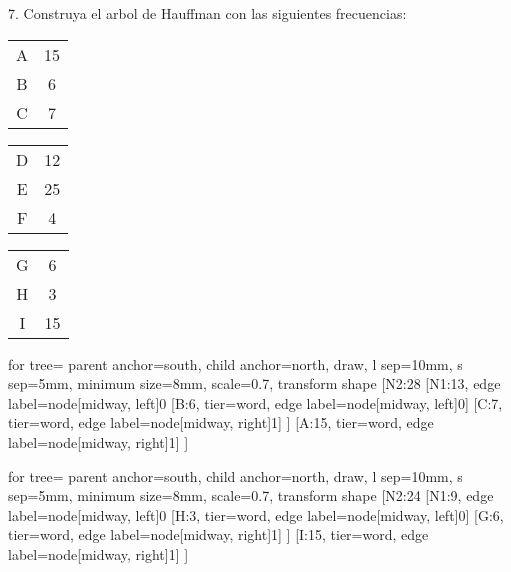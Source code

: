 \documentclass{article}
\begin{document}
	7. Construya el arbol de Hauffman con las siguientes frecuencias:
	\vspace{0.5cm}
	\begin{center}
	\noindent
	\begin{minipage}{0.3\textwidth}
		\begin{tabular}{c|c}
			A & 15 \\
			B & 6  \\
			C & 7  \\
		\end{tabular}
	\end{minipage}
	\hfill
	\begin{minipage}{0.3\textwidth}
		\begin{tabular}{c|c}
			D & 12 \\
			E & 25  \\
			F & 4	 \\
		\end{tabular}
	\end{minipage}
	\hfill
	\begin{minipage}{0.3\textwidth}
		\begin{tabular}{c|c}
			G & 6 \\
			H & 3  \\
			I & 15  \\
		\end{tabular}
	\end{minipage}
	\end{center}
	\vspace{0.5cm}
	\noindent
	\begin{minipage}{0.32\textwidth}
		\begin{forest}
			for tree={
				parent anchor=south,
				child anchor=north,
				draw,
				l sep=10mm,
				s sep=5mm,
				minimum size=8mm,
				scale=0.7,
				transform shape
			}
			[N2:28
			[N1:13, edge label={node[midway, left]{0}}
			[B:6, tier=word, edge label={node[midway, left]{0}}]
			[C:7, tier=word, edge label={node[midway, right]{1}}]
			]
			[A:15, tier=word, edge label={node[midway, right]{1}}]
			]
		\end{forest}
	\end{minipage}%
	\hfill
	\begin{minipage}{0.32\textwidth}
		\begin{forest}
			for tree={
				parent anchor=south,
				child anchor=north,
				draw,
				l sep=10mm,
				s sep=5mm,
				minimum size=8mm,
				scale=0.7,
				transform shape
			}
			[N2:24
			[N1:9, edge label={node[midway, left]{0}}
			[H:3, tier=word, edge label={node[midway, left]{0}}]
			[G:6, tier=word, edge label={node[midway, right]{1}}]
			]
			[I:15, tier=word, edge label={node[midway, right]{1}}]
			]
		\end{forest}
	\end{minipage}%
\end{document}
